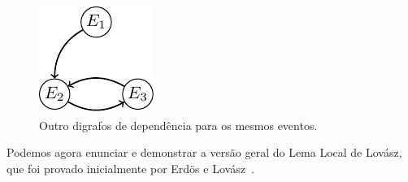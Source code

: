 \begin{figure}[ht!]
\centering
\includegraphics{figures/4_prob_2_ddigraph_2}
\caption{Outro digrafos de dependência para os mesmos eventos.}
\label{prob:fig:ddigraph2}
\end{figure}

Podemos agora enunciar e demonstrar a versão geral do Lema Local de Lovász, que foi provado inicialmente por Erdös e Lovász~\cite{erdos1975problems}.


